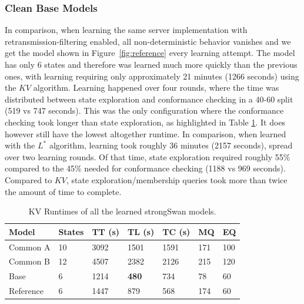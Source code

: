\subsubsection*{Clean Base Models}

In comparison, when learning the same server implementation with retransmission-filtering enabled, all non-deterministic behavior vanishes and we get the model shown in Figure~\ref{fig:reference} every learning attempt. The model has only 6 states and therefore was learned much more quickly than the previous ones, with learning requiring only approximately 21 minutes (1266 seconds) using the $KV$ algorithm. Learning happened over four rounds, where the time was distributed between state exploration and conformance checking in a 40-60 split (519 vs 747 seconds). This was the only configuration where the conformance checking took longer than state exploration, as highlighted in Table \ref{tab:runtime_summary_kv}. It does however still have the lowest altogether runtime. In comparison, when learned with the $L^*$ algorithm, learning took roughly 36 minutes (2157 seconds), spread over two learning rounds. Of that time, state exploration required roughly 55\% compared to the 45\% needed for conformance checking (1188 vs 969 seconds). Compared to $KV$, state exploration/membership queries took more than twice the amount of time to complete.

\begin{table}[h]
	\centering
	\begin{tabular}{|l|l|l|l|l|l|l|}
		\hline
		\rowcolor[HTML]{C0C0C0} 
		Model     & States & TT (s)  & TL (s)  & TC (s)  & MQ  & EQ  \\ \hline
		Common A  & 10     & 3092 & 1501 & 1591 & 171 & 100 \\ \hline
		Common B  & 12     & 4507 & 2382 & 2126 & 215 & 120 \\ \hline
		Base      & 6      & 1214 & \textbf{480}  & 734  & 78  & 60  \\ \hline
		Reference & 6      & 1447 & 879  & 568  & 174 & 60  \\ \hline
	\end{tabular}
	\caption{KV Runtimes of all the learned strongSwan models.}
	\label{tab:runtime_summary_kv}
\end{table}

